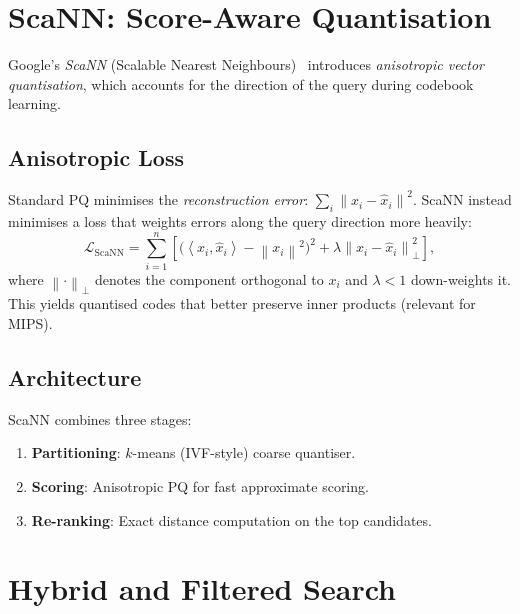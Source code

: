 \documentclass[11pt,a4paper]{article}
\theoremstyle{definition}
\newcommand{\norm}[1]{\left\lVert #1 \right\rVert}
\newcommand{\inner}[2]{\left\langle #1, #2 \right\rangle}
\begin{document}
\section{ScaNN: Score-Aware Quantisation}\label{sec:scann}

Google's \emph{ScaNN} (Scalable Nearest Neighbours)~\cite{guo2020scann}
introduces \emph{anisotropic vector quantisation}, which accounts for the
direction of the query during codebook learning.

\subsection{Anisotropic Loss}

Standard PQ minimises the \emph{reconstruction error}:
$\sum_i \norm{x_i - \hat{x}_i}^2$.  ScaNN instead minimises a loss
that weights errors along the query direction more heavily:
\[
  \mathcal{L}_{\mathrm{ScaNN}} = \sum_{i=1}^n \left[
    \bigl(\inner{x_i}{\hat{x}_i} - \norm{x_i}^2\bigr)^2
    + \lambda \norm{x_i - \hat{x}_i}_{\perp}^2
  \right],
\]
where $\norm{\cdot}_{\perp}$ denotes the component orthogonal to $x_i$
and $\lambda < 1$ down-weights it.  This yields quantised codes that
better preserve inner products (relevant for MIPS).

\subsection{Architecture}

ScaNN combines three stages:
\begin{enumerate}[nosep]
  \item \textbf{Partitioning}: $k$-means (IVF-style) coarse quantiser.
  \item \textbf{Scoring}: Anisotropic PQ for fast approximate scoring.
  \item \textbf{Re-ranking}: Exact distance computation on the top
    candidates.
\end{enumerate}


\section{Hybrid and Filtered Search}\label{sec:hybrid}
\end{document}

